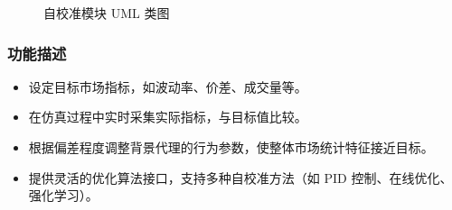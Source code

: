 \begin{figure}[H]
  \centering
  \resizebox{\linewidth}{!}{}
  \caption{自校准模块 UML 类图}
  \label{fig:uml_calibration}
\end{figure}

\subsubsection{功能描述}
\begin{itemize}
  \item 设定目标市场指标，如波动率、价差、成交量等。
  \item 在仿真过程中实时采集实际指标，与目标值比较。
  \item 根据偏差程度调整背景代理的行为参数，使整体市场统计特征接近目标。
  \item 提供灵活的优化算法接口，支持多种自校准方法（如 PID 控制、在线优化、强化学习）。
\end{itemize}

